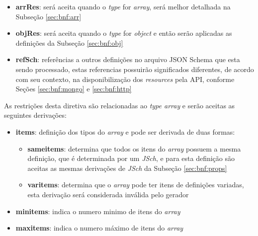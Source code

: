 \begin{itemize}
    \item \textbf{arrRes}: será aceita quando o \textit{type} for \textit{array}, será melhor detalhada na Subseção \ref{sec:bnf:arr}

    \item \textbf{objRes}: será aceita quando o \textit{type} for \textit{object} e então serão aplicadas as definições da Subseção \ref{sec:bnf:obj}

    \item \textbf{refSch}: referências a outros definições no arquivo JSON Schema que esta sendo processado, estas referencias possuirão significados diferentes, de acordo com seu contexto, na disponibilização dos \textit{resources} pela API, conforme Seções \ref{sec:bnf:mongo} e \ref{sec:bnf:http}
\end{itemize}

\label{sec:bnf:arr}
As restrições desta diretiva são relacionadas ao \textit{type array} e serão aceitas as seguintes derivações:
\begin{itemize}
    \item \textbf{items}: definição dos tipos do \textit{array} e pode ser derivada de duas formas:
    \begin{itemize}
        \item \textbf{sameitems}: determina que todos os itens do \textit{array} possuem a mesma definição, que é determinada por um \textit{JSch}, e para esta definição são aceitas as mesmas derivações de \textit{JSch} da Subseção \ref{sec:bnf:props}

        \item \textbf{varitems}: determina que o \textit{array} pode ter itens de definições variadas, esta derivação será considerada inválida pelo gerador

    \end{itemize}


    \item \textbf{minitems}: indica o numero minimo de itens do \textit{array}

    \item \textbf{maxitems}: indica o numero máximo de itens do \textit{array}
\end{itemize}


